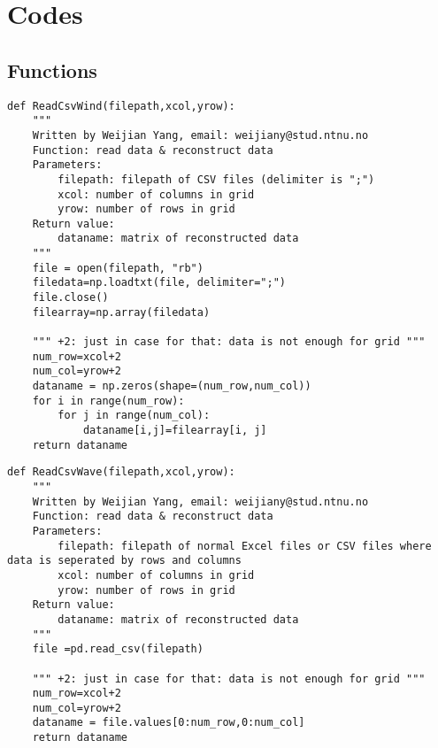 \chapter{Codes}
\section{Functions}
\begin{lstlisting}[caption=Function for reading and reconstructing wind data (\autoref{Data processing}),label=readwind]
def ReadCsvWind(filepath,xcol,yrow):
    """     
    Written by Weijian Yang, email: weijiany@stud.ntnu.no
    Function: read data & reconstruct data 
    Parameters:
        filepath: filepath of CSV files (delimiter is ";")
        xcol: number of columns in grid
        yrow: number of rows in grid 
    Return value:
        dataname: matrix of reconstructed data
    """
    file = open(filepath, "rb")
    filedata=np.loadtxt(file, delimiter=";")
    file.close()
    filearray=np.array(filedata)

    """ +2: just in case for that: data is not enough for grid """
    num_row=xcol+2                  
    num_col=yrow+2
    dataname = np.zeros(shape=(num_row,num_col))
    for i in range(num_row):
        for j in range(num_col):
            dataname[i,j]=filearray[i, j]
    return dataname
\end{lstlisting}
\begin{lstlisting}[caption=Function for reading and reconstructing wave data (\autoref{Data processing}),label=readwave]
def ReadCsvWave(filepath,xcol,yrow):
    """     
    Written by Weijian Yang, email: weijiany@stud.ntnu.no
    Function: read data & reconstruct data 
    Parameters:
        filepath: filepath of normal Excel files or CSV files where data is seperated by rows and columns
        xcol: number of columns in grid
        yrow: number of rows in grid 
    Return value:
        dataname: matrix of reconstructed data
    """
    file =pd.read_csv(filepath)

    """ +2: just in case for that: data is not enough for grid """
    num_row=xcol+2 
    num_col=yrow+2
    dataname = file.values[0:num_row,0:num_col]
    return dataname
\end{lstlisting}
